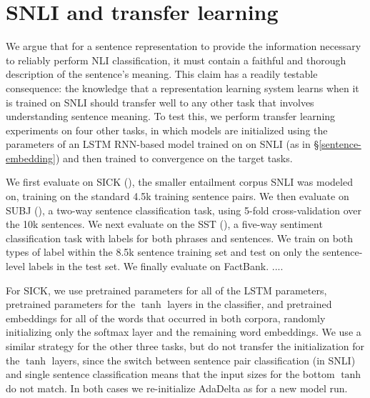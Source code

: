 \section{SNLI and transfer learning}

We argue that for a sentence representation to provide the information necessary to reliably perform NLI classification, it must contain a faithful and thorough description of the sentence's meaning. This claim has a readily testable consequence: the knowledge that a representation learning system learns when it is trained on SNLI should transfer well to any other task that involves understanding sentence meaning. To test this, we perform transfer learning experiments on four other tasks, in which models are initialized using the parameters of an LSTM RNN-based model trained on  on SNLI (as in \S\ref{sentence-embedding}) and then trained to convergence on the target tasks. 

We first evaluate on SICK (\citealt{marelli2014sick}), the smaller entailment corpus SNLI was modeled on, training on the standard 4.5k training sentence pairs. We then evaluate on SUBJ (\citealt{pang2004sentimental}), a two-way sentence classification task, using 5-fold cross-validation over the 10k sentences. We next evaluate on the SST (\citealt{socher2013acl1}), a five-way sentiment classification task with labels for both phrases and sentences. We train on both types of label within the 8.5k sentence training set and test on only the sentence-level labels in the test set. We finally evaluate on FactBank.  ....

 For SICK, we use pretrained parameters for all of the LSTM parameters, pretrained parameters for the $\tanh$ layers in the classifier, and pretrained embeddings for all of the words that occurred in both corpora, randomly initializing only the softmax layer and the remaining word embeddings. We use a similar strategy for the other three tasks, but do not transfer the initialization for the $\tanh$ layers, since the switch between sentence pair classification (in SNLI) and single sentence classification means that the input sizes for the bottom $\tanh$ do not match. In both cases we re-initialize AdaDelta as for a new model run.


